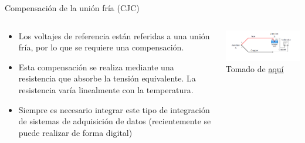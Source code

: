 \documentclass[aspectratio=169]{beamer}
\begin{document}
\begin{frame}{Compensación de la unión fría (CJC)}
 \begin{columns}[c, onlytextwidth]
        \begin{column}{0.45\textwidth}
            \begin{itemize}
                \item Los voltajes de referencia están referidas a una unión fría, por lo que se requiere una compensación.  
                \item Esta compensación se realiza mediante una resistencia que absorbe la tensión equivalente. La resistencia varía linealmente con la temperatura. 
                \item Siempre es necesario integrar este tipo de integración de sistemas de adquisición de datos (recientemente se puede realizar de forma digital)
                
            \end{itemize}
        \end{column}
        \begin{column}{0.5\textwidth}
            \includegraphics[width=8.5cm]{fig/Thermocouple_cjc.png}
            \\ \tiny{Tomado de \href{https://forumautomation.com/t/what-is-cold-junction-compensation-in-thermocouple/2896}{aquí}}
        \end{column}
    \end{columns}
\end{frame}
\end{document}
